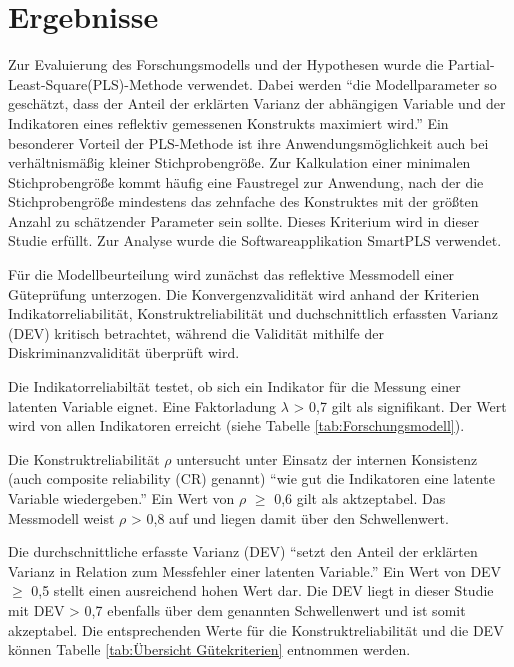\section{Ergebnisse}
\label{sec:ergebnisse}
\nocite{lohmoller2013latent}
Zur Evaluierung des Forschungsmodells und der Hypothesen wurde die Partial-Least-Square(PLS)-Methode verwendet. Dabei werden "`die Modellparameter so geschätzt, dass der Anteil der erklärten Varianz der abhängigen Variable und der Indikatoren eines reflektiv gemessenen Konstrukts maximiert wird."'\parencite[S.16]{nitzl2010anwenderorientierte} Ein besonderer Vorteil der PLS-Methode ist ihre Anwendungsmöglichkeit auch bei verhältnismäßig kleiner Stichprobengröße. Zur Kalkulation einer minimalen Stichprobengröße kommt häufig eine Faustregel zur Anwendung, nach der die Stichprobengröße mindestens das zehnfache des Konstruktes mit der größten Anzahl zu schätzender Parameter sein sollte.\parencite[vgl.][S.394]{islam2013investigating} Dieses Kriterium wird in dieser Studie erfüllt. Zur Analyse wurde die Softwareapplikation SmartPLS verwendet. 

Für die Modellbeurteilung wird zunächst das reflektive Messmodell einer Güteprüfung unterzogen. Die Konvergenzvalidität wird anhand der Kriterien Indikatorreliabilität, Konstruktreliabilität und duchschnittlich erfassten Varianz (DEV) kritisch betrachtet, während die Validität mithilfe der Diskriminanzvalidität überprüft wird.

Die Indikatorreliabiltät testet, ob sich ein Indikator für die Messung einer latenten Variable eignet. Eine Faktorladung $\lambda$ > 0,7 gilt als signifikant.\parencite[vgl.][S.24]{nitzl2010anwenderorientierte} Der Wert wird von allen Indikatoren erreicht (siehe Tabelle \ref{tab:Forschungsmodell}). 

Die Konstruktreliabilität $\rho$ untersucht unter Einsatz der internen Konsistenz (auch composite reliability (CR) genannt) "`wie gut die Indikatoren eine latente Variable wiedergeben."' Ein Wert von $\rho$ $\geq$ 0,6 gilt als aktzeptabel.\parencite[vgl.][S.212]{ringle2007beurteilung} Das Messmodell weist $\rho$ > 0,8 auf und liegen damit über den Schwellenwert.  

Die durchschnittliche erfasste Varianz (DEV) "`setzt den Anteil der erklärten Varianz in Relation zum Messfehler einer latenten Variable."' \parencite[S.25]{nitzl2010anwenderorientierte} Ein Wert von DEV $\geq$ 0,5 stellt einen ausreichend hohen Wert dar. Die DEV liegt in dieser Studie mit DEV > 0,7 ebenfalls über dem genannten Schwellenwert und ist somit akzeptabel. Die entsprechenden Werte für die Konstruktreliabilität und die DEV können Tabelle \ref{tab:Übersicht Gütekriterien} entnommen werden.

